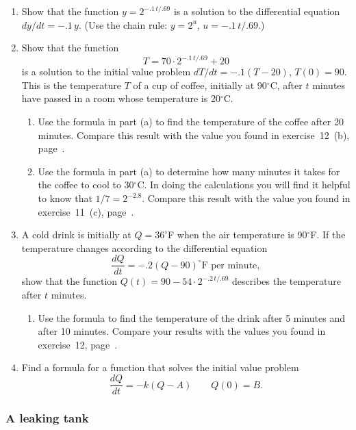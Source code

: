 \begin{enumerate}
\item Show that the function $y = 2^{-.1\,t/.69}$ is a solution to the
differential equation $dy/dt = -.1\,y$.  (Use the chain rule: $y =
2^u$, $u = -.1\,t/.69$.)


\item Show that the function
	\[
T = 70 \cdot 2^{-.1\,t/.69} + 20
\]
is a solution to the initial value problem $dT/dt = -.1(T - 20)$,
$T(0) = 90$.  This is the temperature $T$ of a cup of coffee,
initially at 90$^{\circ}$C, after $t$ minutes have passed in a room
whose temperature is 20$^{\circ}$C.

  \begin{enumerate}
  \item Use the formula in part (a) to find the temperature of the coffee
after 20 minutes.  Compare this result with the value you found in
exercise~12~(b), page~\pageref{ex:coffee1}.

  \item Use the formula in part (a) to determine how many minutes it
takes for the coffee to cool to 30$^{\circ}$C.  In doing the
calculations you will find it helpful to know that $1/7 = 2^{-2.8}$.
Compare this result with the value you found in exercise~11~(c),
page~\pageref{ex:coffee2}.


\end{enumerate}
\item A cold drink is initially at $ Q = 36^{\circ}$F when the air
temperature is 90$^{\circ}$F.  If the temperature changes according to
the differential equation
	\[
\dfrac{dQ}{dt} = -.2 (Q - 90) ^{\circ}
		\mbox{F per minute},
\]
show that the function $Q(t) = 90 - 54\cdot2^{-.2\,t/.69}$ describes
the temperature after $t$ minutes.

  \begin{enumerate}
  \item Use the formula to find the temperature of the drink after 5
minutes and after 10 minutes.  Compare your results with the values
you found in exercise~12, page~\pageref{ex:cold drink}.



\end{enumerate}
\item Find a formula for a function that solves the initial value problem
	\[
\dfrac{dQ}{dt} = -k(Q - A) \qquad Q(0) = B.
\]


\end{enumerate}
\subsubsection{A leaking tank}
\label{subsubsec:a-leaking-tank}
\label{leaking tank-begin}

